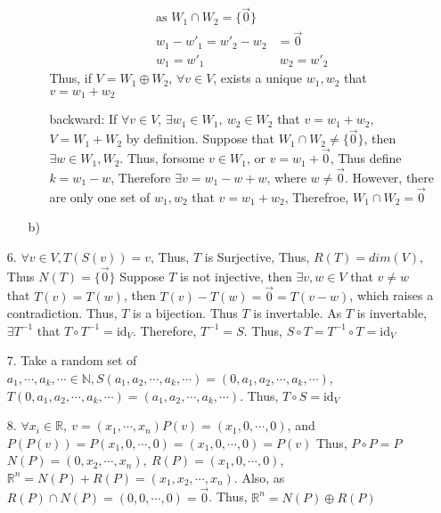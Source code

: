 \documentclass{article}
\begin{document}
\begin{itemize}
\begin{itemize}
\begin{itemize}
\begin{align*}
            \text{as }W_1\cap W_2 = \{\overrightarrow{0}\}\\
            w_1-w'_1=w'_2-w_2&=\overrightarrow{0}\\
            w_1=w'_1\ &\ w_2=w'_2
        \end{align*}
        Thus, if \(V=W_1\oplus W_2\), \(\forall v\in V\), exists a unique \(w_1,w_2\) that \(v = w_1+w_2\)
        \item [backward:] If \(\forall v \in V\), \(\exists w_1\in W_1,\ w_2\in W_2\) that \(v=w_1+w_2\), \(V = W_1+W_2\) by definition. Suppose that \(W_1\cap W_2 \neq \{\overrightarrow{0}\}\), 
        then \(\exists w\in W_1,W_2\). Thus, forsome \(v\in W_1\), or \(v = w_1+\overrightarrow{0}\),  Thus define \(k = w_1-w\), Therefore \(\exists v = w_1-w+w\), where \(w\neq \overrightarrow{0}\). However, there are only one set of \(w_1,w_2\) that \(v=w_1+w_2\), Therefroe, \(W_1\cap W_2 = \overrightarrow{0}\)
    \end{itemize}
    \item [b)]
\end{itemize}
\item [6.]\(\forall v\in V, T(S(v)) = v\), Thus, \(T\) is Surjective, Thus, \(R(T)=dim(V)\), Thus \(N(T)=\{\overrightarrow{0}\}\)
Suppose \(T\) is not injective, then \(\exists v,w \in V\) that \(v\neq w\) that \(T(v)=T(w)\), then \(T(v)-T(w)=\overrightarrow{0}=T(v-w)\), which raises a contradiction. Thus, \(T\) is a bijection. Thus \(T\) is invertable.
As \(T\) is invertable, \(\exists T^{-1}\) that \(T\circ T^{-1} = \text{id}_V\). Therefore, \(T^{-1} = S\). Thus, \(S\circ T = T^{-1}\circ T = \text{id}_V\)
\item [7.] Take a random set of \(a_1,\cdots,a_k,\cdots\in \mathbb{N}, S(a_1,a_2,\cdots,a_k,\cdots)=(0,a_1,a_2,\cdots,a_k,\cdots)\),
            \(T(0,a_1,a_2,\cdots,a_k,\cdots)=(a_1,a_2,\cdots,a_k,\cdots)\). Thus, \(T\circ S = \text{id}_V\)
\item [8.] \(\forall x_i\in\mathbb{R},\ v=(x_1,\cdots,x_n) P(v) = (x_1,0,\cdots,0) \), and \(P(P(v)) = P(x_1,0,\cdots,0) = (x_1,0,\cdots,0) = P(v)\)
Thus, \(P\circ P = P\)\\
\(N(P) = (0,x_2,\cdots,x_n),\ R(P) = (x_1,0,\cdots,0)\), \(\mathbb{R}^n = N(P)+R(P) = (x_1,x_2,\cdots,x_n)\). Also, as \(R(P)\cap N(P) = (0,0,\cdots,0)=\overrightarrow{0}\). Thus, \(\mathbb R ^n = N(P)\oplus R(P)\)
\end{itemize}
\end{document}
